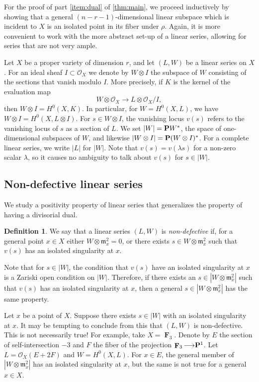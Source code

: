 \documentclass[11pt,reqno]{amsart}
\theoremstyle{plain}
\theoremstyle{definition}
\newtheorem{definition}[theorem]{Definition}
\theoremstyle{remark}
\numberwithin{equation}{section}
\DeclareMathOperator{\F}{\mathbf F}
\renewcommand{\to}{{\longrightarrow}}
\numberwithin{equation}{section}
\renewcommand{\O}{\mathcal O}
\begin{document}
For the proof of part \eqref{item:dual} of \autoref{thm:main}, we proceed inductively by showing that a general $(n-r-1)$-dimensional linear subspace which is incident to $X$ is an isolated point in its fiber under $\rho$.
Again, it is more convenient to work with the more abstract set-up of a linear series, allowing for series that are not very ample.

Let $X$ be a proper variety of dimension $r$, and let $(L, W)$ be a linear series on $X$.
For an ideal sheaf $I \subset \O_X$ we denote by $W \otimes I$ the subspace of $W$ consisting of the sections that vanish modulo $I$. %
More precisely, if $K$ is the kernel of the evaluation map
\[ W \otimes \O_X \to L \otimes \O_X/I,\]
then $W \otimes I = H^0(X, K)$.
In particular, for $W = H^0(X, L)$, we have $W \otimes I = H^0(X, L \otimes I)$.
For $s \in W \otimes I$, the vanishing locus $v(s)$ refers to the vanishing locus of $s$ as a section of $L$.
We set $|W| = \P W^*$, the space of one-dimensional subspaces of $W$, and likewise $|W \otimes I| = \P (W \otimes I)^*$.
For a complete linear series, we write $|L|$ for $|W|$.
Note that $v(s) = v(\lambda s)$ for a non-zero scalar $\lambda$, so it causes no ambiguity to talk about $v(s)$ for $s \in |W|$.

\subsection{Non-defective linear series}\label{sec:non-defectivity}
We study a positivity property of linear series that generalizes the property of having a divisorial dual.
\begin{definition}
  \label{definition:Genericallynon-defective} 
  We say that a linear series $(L, W)$ is \emph{non-defective} if,  for a general point $x \in X$ either $W \otimes \mathfrak m_x^2 = 0$, or there exists $s \in W \otimes \mathfrak m_x^2$ such that $v(s)$ has an isolated singularity at $x$.
\end{definition}
Note that for $s \in |W|$, the condition that $v(s)$ have an isolated singularity at $x$ is a Zariski open condition on $|W|$.
Therefore, if there exists an $s \in |W \otimes \mathfrak m_x^2|$ such that $v(s)$ has an isolated singularity at $x$, then a general $s \in |W \otimes \mathfrak m_x^2|$ has the same property.
\begin{remark}
  Let $x$ be a point of $X$.
  Suppose there exists $s \in |W|$ with an isolated singularity at $x$.
  It may be tempting to conclude from this that $(L, W)$ is non-defective.
  This is not necessarily true!
  For example, take $X = \F_3$.
  Denote by $E$ the section of self-intersection $-3$ and $F$ the fiber of the projection $\F_3 \to \P^1$.
  Let $L = \O_X(E + 2F)$ and $W = H^0(X, L)$.
  For $x \in E$, the general member of $|W \otimes \mathfrak m_x^2|$ has an isolated singularity at $x$, but the same is not true for a general $x \in X$.
\end{remark}
\end{document}
